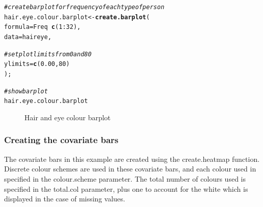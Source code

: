 \documentclass[letterpaper]{article}\usepackage[]{graphicx}\usepackage[]{color}
\makeatletter
\newcommand{\hlnum}[1]{\textcolor[rgb]{0.686,0.059,0.569}{#1}}%
\newcommand{\hlcom}[1]{\textcolor[rgb]{0.678,0.584,0.686}{\textit{#1}}}%
\newcommand{\hlopt}[1]{\textcolor[rgb]{0,0,0}{#1}}%
\newcommand{\hlstd}[1]{\textcolor[rgb]{0.345,0.345,0.345}{#1}}%
\newcommand{\hlkwb}[1]{\textcolor[rgb]{0.69,0.353,0.396}{#1}}%
\newcommand{\hlkwc}[1]{\textcolor[rgb]{0.333,0.667,0.333}{#1}}%
\newcommand{\hlkwd}[1]{\textcolor[rgb]{0.737,0.353,0.396}{\textbf{#1}}}%
\newenvironment{kframe}{%
 \def\at@end@of@kframe{}%
 \ifinner\ifhmode%
  \def\at@end@of@kframe{\end{minipage}}%
  \begin{minipage}{\columnwidth}%
 \fi\fi%
 \def\FrameCommand##1{\hskip\@totalleftmargin \hskip-\fboxsep
 \colorbox{shadecolor}{##1}\hskip-\fboxsep
     \hskip-\linewidth \hskip-\@totalleftmargin \hskip\columnwidth}%
 \MakeFramed {\advance\hsize-\width
   \@totalleftmargin\z@ \linewidth\hsize
   \@setminipage}}%
 {\par\unskip\endMakeFramed%
 \at@end@of@kframe}
\newenvironment{knitrout}{}{} %
\makeatother
\begin{document}
\begin{knitrout}
\color{fgcolor}\begin{kframe}
\begin{alltt}
\hlcom{# create barplot for frequency of each type of person}
\hlstd{hair.eye.colour.barplot} \hlkwb{<-} \hlkwd{create.barplot}\hlstd{(}
        \hlkwc{formula} \hlstd{= Freq} \hlopt{~} \hlkwd{c}\hlstd{(}\hlnum{1}\hlopt{:}\hlnum{32}\hlstd{),}
        \hlkwc{data} \hlstd{= haireye,}

        \hlcom{# set plot limits from 0 and 80 }
        \hlkwc{ylimits} \hlstd{=} \hlkwd{c}\hlstd{(}\hlnum{0.00}\hlstd{,} \hlnum{80}\hlstd{)}
        \hlstd{);}

\hlcom{# show barplot}
\hlstd{hair.eye.colour.barplot}
\end{alltt}
\end{kframe}\begin{figure}

{\centering {} 

}

\caption[Hair and eye colour barplot]{Hair and eye colour barplot\label{fig:multiplotex1_barplot}}
\end{figure}


\end{knitrout}

\subsubsection{Creating the covariate bars}
The covariate bars in this example are created using the create.heatmap function.  Discrete colour schemes are used in these covariate bars, and each colour used in specified in the colour.scheme parameter. The total number of colours used is specified in the total.col parameter, plus one to account for the white which is displayed in the case of missing values.
\end{document}
